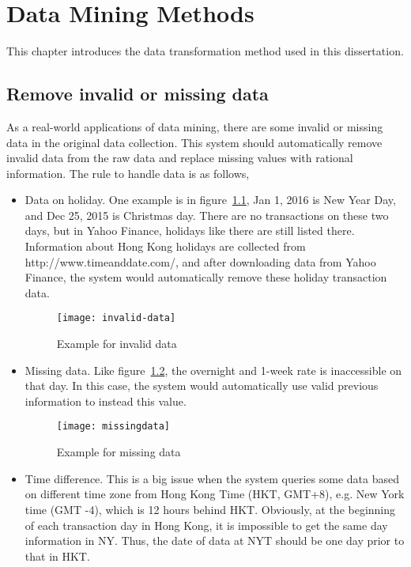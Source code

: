 \chapter{Data Mining Methods}
\label{ch:mining}

This chapter introduces the data transformation method used in this dissertation.
\section{Remove invalid or missing data}
As a real-world applications of data mining, there are some invalid or missing data in the original data collection. This system should automatically remove invalid data from the raw data and replace missing values with rational information. The rule to handle data is as follows,

\begin{itemize}
	\item Data on holiday. One example is in figure~\ref{fg:invalid_data}, Jan 1, 2016 is New Year Day, and Dec 25, 2015 is Christmas day. There are no transactions on these two days, but in Yahoo Finance, holidays like there are still listed there. Information about Hong Kong holidays are collected from http://www.timeanddate.com/, and after downloading data from Yahoo Finance, the system would automatically remove these holiday transaction data.
	\begin{figure}[h]
		\centering
		\texttt{[image: invalid-data]}
		\caption{Example for invalid data}
		\label{fg:invalid_data}
	\end{figure}
	\item Missing data. Like figure~\ref{fg:missing_data}, the overnight and 1-week rate is inaccessible on that day. In this case, the system would automatically use valid previous information to instead this value.
	\begin{figure}[h]
		\centering
		\texttt{[image: missingdata]}
		\caption{Example for missing data}
		\label{fg:missing_data}
	\end{figure}
	\item Time difference. This is a big issue when the system queries some data based on different time zone from Hong Kong Time (HKT, GMT+8), e.g. New York time (GMT -4), which is 12 hours behind HKT. Obviously, at the beginning of each transaction day in Hong Kong, it is impossible to get the same day information in NY. Thus, the date of data at NYT should be one day prior to that in HKT.
\end{itemize}


